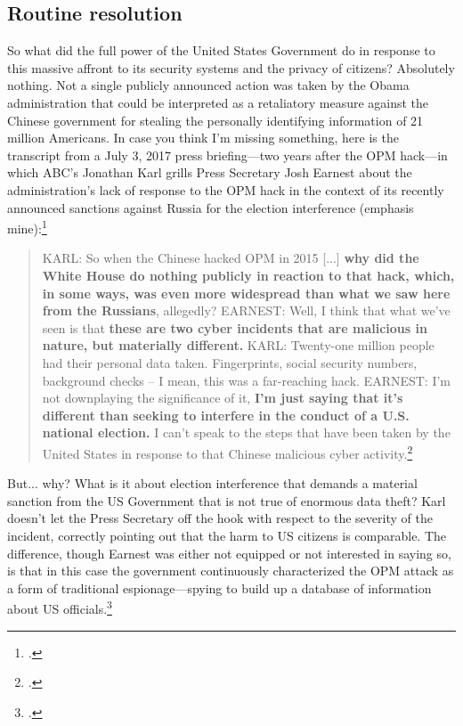 \documentclass{memoir}
\begin{document}
\begin{refsegment}
\subsection{Routine resolution}
So what did the full power of the United States Government do in response to this massive affront to its security systems and the privacy of citizens? Absolutely nothing. Not a single publicly announced action was taken by the Obama administration that could be interpreted as a retaliatory measure against the Chinese government for stealing the personally identifying information of 21 million Americans.  In case you think I'm missing something, here is the transcript from a July 3, 2017 press briefing---two years after the OPM hack---in which ABC's Jonathan Karl grills Press Secretary Josh Earnest about the administration's lack of response to the OPM hack in the context of its recently announced sanctions against Russia for the election interference (emphasis mine):\footcite[You can watch the full exchange via video here. It's pretty awkward.]{gill_earnest_2017}

\begin{quote}
KARL: So when the Chinese hacked OPM in 2015 [...] \textbf{why did the White House do nothing publicly in reaction to that hack, which, in some ways, was even more widespread than what we saw here from the Russians}, allegedly?
\newline \newline
EARNEST: Well, I think that what we've seen is that \textbf{these are two cyber incidents that are malicious in nature, but materially different.}
\newline \newline
KARL: Twenty-one million people had their personal data taken.  Fingerprints, social security numbers, background checks -- I mean, this was a far-reaching hack.
\newline \newline
EARNEST: I'm not downplaying the significance of it, \textbf{I'm just saying that it's different than seeking to interfere in the conduct of a U.S. national election.} I can't speak to the steps that have been taken by the United States in response to that Chinese malicious cyber activity.\footcite[Transcript adapted from the official White House website.]{earnest_press_2017}
\end{quote}

But... why? What is it about election interference that demands a material sanction from the US Government that is not true of enormous data theft? Karl doesn't let the Press Secretary off the hook with respect to the severity of the incident, correctly pointing out that the harm to US citizens is comparable. The difference, though Earnest was either not equipped or not interested in saying so, is that in this case the government continuously characterized the OPM attack as a form of traditional espionage---spying to build up a database of information about US officials.\footcite{nakashima_chinese_2015}


\end{refsegment}
\end{document}
